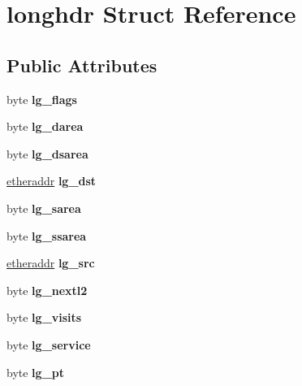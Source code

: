 \hypertarget{structlonghdr}{
\section{longhdr Struct Reference}
\label{structlonghdr}
}
\subsection*{Public Attributes}
\begin{DoxyCompactItemize}
\item 
\hypertarget{structlonghdr_a6b4c23c25c5641bd18c5a7f5c1458b24}{
byte {\bfseries lg\_\-flags}}
\label{structlonghdr_a6b4c23c25c5641bd18c5a7f5c1458b24}

\item 
\hypertarget{structlonghdr_a919d576e19e34ebe5b95720b12da71fa}{
byte {\bfseries lg\_\-darea}}
\label{structlonghdr_a919d576e19e34ebe5b95720b12da71fa}

\item 
\hypertarget{structlonghdr_a77d74d4e966219960b17892204cd21e1}{
byte {\bfseries lg\_\-dsarea}}
\label{structlonghdr_a77d74d4e966219960b17892204cd21e1}

\item 
\hypertarget{structlonghdr_ae21b2640a214f58373ac18ef614a92be}{
\hyperlink{unionetheraddress}{etheraddr} {\bfseries lg\_\-dst}}
\label{structlonghdr_ae21b2640a214f58373ac18ef614a92be}

\item 
\hypertarget{structlonghdr_aafd4e00eddd6b8a342ea7538429f5591}{
byte {\bfseries lg\_\-sarea}}
\label{structlonghdr_aafd4e00eddd6b8a342ea7538429f5591}

\item 
\hypertarget{structlonghdr_a7fb75018924fe438f6db47c5663847a1}{
byte {\bfseries lg\_\-ssarea}}
\label{structlonghdr_a7fb75018924fe438f6db47c5663847a1}

\item 
\hypertarget{structlonghdr_a64f9b9f6869c0a59de9aeb05635a0743}{
\hyperlink{unionetheraddress}{etheraddr} {\bfseries lg\_\-src}}
\label{structlonghdr_a64f9b9f6869c0a59de9aeb05635a0743}

\item 
\hypertarget{structlonghdr_a2a2ac5b785a34342b2bc8f01830974d6}{
byte {\bfseries lg\_\-nextl2}}
\label{structlonghdr_a2a2ac5b785a34342b2bc8f01830974d6}

\item 
\hypertarget{structlonghdr_a201d5506c79d8f6d862da9c9352d5b70}{
byte {\bfseries lg\_\-visits}}
\label{structlonghdr_a201d5506c79d8f6d862da9c9352d5b70}

\item 
\hypertarget{structlonghdr_a7a0dc1b7e0d70ce32c413dac4783a1bb}{
byte {\bfseries lg\_\-service}}
\label{structlonghdr_a7a0dc1b7e0d70ce32c413dac4783a1bb}

\item 
\hypertarget{structlonghdr_aadd217c968d5890f9f44b663e9379fbb}{
byte {\bfseries lg\_\-pt}}
\label{structlonghdr_aadd217c968d5890f9f44b663e9379fbb}

\end{DoxyCompactItemize}


